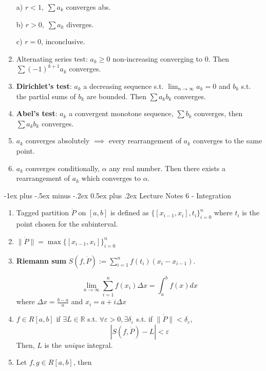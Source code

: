 \documentclass[10pt,landscape]{article}
\makeatletter
\renewcommand{\section}{\@startsection{section}{1}{0mm}%
                                {-1ex plus -.5ex minus -.2ex}%
                                {0.5ex plus .2ex}%
                                {\normalfont\large\bfseries}}
\makeatother
\begin{document}
\begin{multicols}{3}
\begin{enumerate}
	a) $r<1, \; \sum a_k$ converges abs.
	
	b) $r>0, \; \sum a_k$ diverges.
	
	c) $r=0$, inconclusive.  
	
	\item Alternating series test: $a_k\geq 0 $ non-increasing converging to 0. Then $\sum (-1)^{k+1} a_k$ converges. 

	
	\item \textbf{Dirichlet's test}: $a_k$ a decreasing sequence s.t. $\lim_{n\rightarrow \infty} a_k = 0$ and $b_k$ s.t. the partial sums of $b_k$ are bounded. Then $\sum a_k b_k$ converges.
	
	\item \textbf{Abel's test}: $a_k$ a convergent monotone sequence, $\sum b_k$ converges, then $\sum a_k b_k $ converges. 
	
	\item $a_k$ converges absolutely $\implies$ every rearrangement of $a_k$ converges to the same point. 
	\item $a_k$ converges conditionally, $\alpha$ any real number. Then there exists a rearrangement of $a_k$ which converges to $\alpha$.
	 
\end{enumerate}

\section{Lecture Notes 6 - Integration}

\begin{enumerate}
	\item Tagged partition $\dot{P}$ on $[a,b]$ is defined as $\{[x_{i-1}, x_i ], t_i\}^n_{i=0}$ where $t_i$ is the point chosen for the subinterval.
	\item $\|\dot{P} \| = \max \{[x_{i-1}, x_i ]\}^n_{i=0}$
	\item \textbf{Riemann sum} $S(f, \dot{P}) := \sum^n_{i=1} f(t_i)( x_i -x_{i-1})$.
	
	$$\lim_{n\rightarrow \infty}\sum^n_{i=1} f(x_i) \Delta x = \int^b_a f(x)dx$$
	where $\Delta x = \frac{b-a}{n}$ and $x_i = a + i\Delta x$
	\item $f \in R[a,b]$ if $\exists L \in \mathbb{R}$ s.t. $\forall \varepsilon > 0, \exists \delta_\varepsilon$ s.t. if $\|\dot{P}\| < \delta_\varepsilon$, $$|S(f, \dot{P})- L| < \varepsilon$$
	Then, $L$ is the \textit{unique} integral. 
	\item Let $f,g \in R[a,b]$, then
	

\end{enumerate}
\end{multicols}
\end{document}

